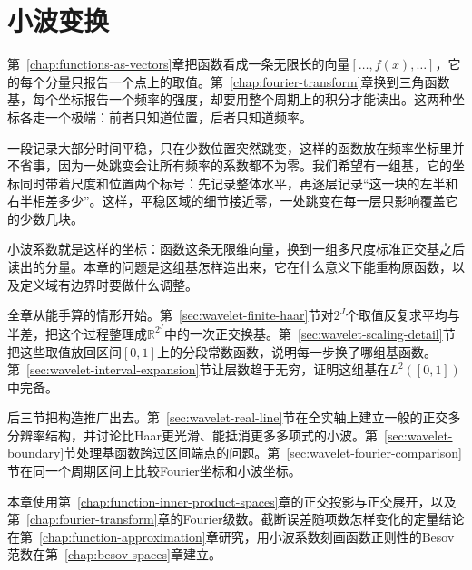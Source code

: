 \chapter{小波变换}
\label{chap:wavelet-transform}

第~\ref{chap:functions-as-vectors}章把函数看成一条无限长的向量$[\ldots,f(x),\ldots]$，它的每个分量只报告一个点上的取值。第~\ref{chap:fourier-transform}章换到三角函数基，每个坐标报告一个频率的强度，却要用整个周期上的积分才能读出。这两种坐标各走一个极端：前者只知道位置，后者只知道频率。

一段记录大部分时间平稳，只在少数位置突然跳变，这样的函数放在频率坐标里并不省事，因为一处跳变会让所有频率的系数都不为零。我们希望有一组基，它的坐标同时带着尺度和位置两个标号：先记录整体水平，再逐层记录“这一块的左半和右半相差多少”。这样，平稳区域的细节接近零，一处跳变在每一层只影响覆盖它的少数几块。

小波系数就是这样的坐标：函数这条无限维向量，换到一组多尺度标准正交基之后读出的分量。本章的问题是这组基怎样造出来，它在什么意义下能重构原函数，以及定义域有边界时要做什么调整。

全章从能手算的情形开始。第~\ref{sec:wavelet-finite-haar}节对$2^J$个取值反复求平均与半差，把这个过程整理成$\mathbb R^{2^J}$中的一次正交换基。第~\ref{sec:wavelet-scaling-detail}节把这些取值放回区间$[0,1]$上的分段常数函数，说明每一步换了哪组基函数。第~\ref{sec:wavelet-interval-expansion}节让层数趋于无穷，证明这组基在$L^2([0,1])$中完备。

后三节把构造推广出去。第~\ref{sec:wavelet-real-line}节在全实轴上建立一般的正交多分辨率结构，并讨论比Haar更光滑、能抵消更多多项式的小波。第~\ref{sec:wavelet-boundary}节处理基函数跨过区间端点的问题。第~\ref{sec:wavelet-fourier-comparison}节在同一个周期区间上比较Fourier坐标和小波坐标。

本章使用第~\ref{chap:function-inner-product-spaces}章的正交投影与正交展开，以及第~\ref{chap:fourier-transform}章的Fourier级数。截断误差随项数怎样变化的定量结论在第~\ref{chap:function-approximation}章研究，用小波系数刻画函数正则性的Besov范数在第~\ref{chap:besov-spaces}章建立。








